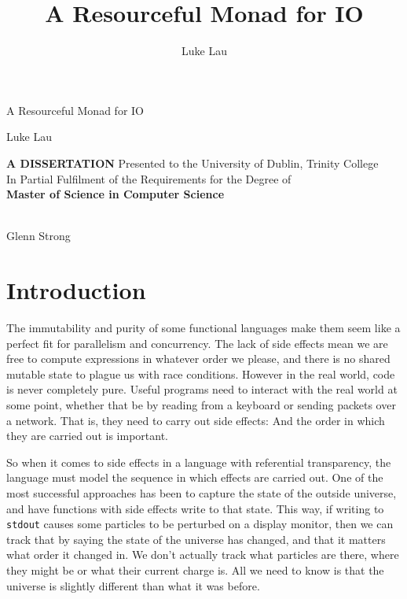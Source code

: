 \documentclass{report}
\begin{document}
\newcommand{\llbracket}{[\![}
\newcommand{\rrbracket}{]\!]}
\newcommand{\IO}{\mathsf{IO}}
\newcommand{\bind}{>\!\!>\!\!=} \newcommand{\concbind}{>\!\!>\!>\!\!=}
\newcommand{\subtyp}{\geq:}
\newcommand{\notsubtyp}{\ngeq:}
\newcommand{\lift}[1]{\ensuremath{\llbracket#1\rrbracket}}
\newcommand{\use}[2]{\ensuremath{\llbracket#2\rrbracket_{#1}}}
\newcommand{\ftv}{\operatorname{FTV}}
\newcommand{\fv}{\operatorname{FV}}
\newtheorem{theorem}{Theorem}
\newtheorem{lemma}{Lemma}

\author{Luke Lau}
\title{A Resourceful Monad for IO}
\begin{titlepage}
  \begin{center}
    {\Huge A Resourceful  Monad for IO}
    \vskip 0.25in
    \centerline{\Large Luke Lau}
    \vfill
    \large
    {
      {\uppercase{\Large \bf A Dissertation}}
      \vskip 0.2in
      Presented to the University of Dublin, Trinity College \\
      In Partial Fulfilment of the Requirements for the Degree of \\
      \vskip 0.2in
      {\bf Master of Science in Computer Science}
    }

    \vfill
  \end{center}

   \\
  Glenn Strong

\end{titlepage}

\tableofcontents

\chapter{Introduction}
The immutability and purity of some functional languages make them seem like a
perfect fit for parallelism and concurrency. The lack of side effects mean we
are free to compute expressions in whatever order we please, and there is no
shared mutable state to plague us with race conditions. However in the
real world, code is never completely pure. Useful programs need to interact with
the real world at some point, whether that be by reading from a keyboard or
sending packets over a network. That is, they need to carry out side
effects: And the order in which they are carried out is important.

So when it comes to side effects in a language with referential transparency,
the language must model the sequence in which effects are carried out. One of
the most successful approaches has been to capture the state of the outside
universe, and have functions with side effects write to that state. This way, if
writing to \texttt{stdout} causes some particles to be perturbed on a display
monitor, then we can track that by saying the state of the universe has changed,
and that it matters what order it changed in. We don't actually track what
particles are there, where they might be or what their current charge is. All we
need to know is that the universe is slightly different than what it was before.
\end{document}
